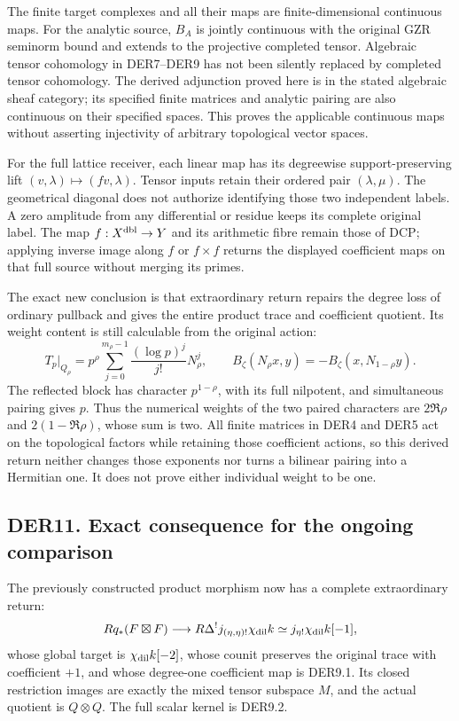 The finite target complexes and all their maps are finite-dimensional
continuous maps. For the analytic source, \(B_A\) is jointly continuous
with the original GZR seminorm bound and extends to the projective
completed tensor. Algebraic tensor cohomology in DER7--DER9 has not been
silently replaced by completed tensor cohomology. The derived adjunction
proved here is in the stated algebraic sheaf category; its specified
finite matrices and analytic pairing are also continuous on their
specified spaces. This proves the applicable continuous maps without
asserting injectivity of arbitrary topological vector spaces.

For the full lattice receiver, each linear map has its degreewise
support-preserving lift \((v,\lambda)\mapsto(fv,\lambda)\). Tensor
inputs retain their ordered pair \((\lambda,\mu)\). The geometrical
diagonal does not authorize identifying those two independent labels. A
zero amplitude from any differential or residue keeps its complete
original label. The map \(f:X^{\rm dbl}\to Y\) and its arithmetic fibre
remain those of DCP; applying inverse image along \(f\) or \(f\times f\)
returns the displayed coefficient maps on that full source without
merging its primes.

The exact new conclusion is that extraordinary return repairs the degree
loss of ordinary pullback and gives the entire product trace and
coefficient quotient. Its weight content is still calculable from the
original action: \[
T_p|_{Q_\rho}
=p^\rho\sum_{j=0}^{m_\rho-1}\frac{(\log p)^j}{j!}N_\rho^j,\qquad
B_\zeta(N_\rho x,y)=-B_\zeta(x,N_{1-\rho}y).
\] The reflected block has character \(p^{1-\rho}\), with its full
nilpotent, and simultaneous pairing gives \(p\). Thus the numerical
weights of the two paired characters are \(2\Re\rho\) and
\(2(1-\Re\rho)\), whose sum is two. All finite matrices in DER4 and DER5
act on the topological factors while retaining those coefficient
actions, so this derived return neither changes those exponents nor
turns a bilinear pairing into a Hermitian one. It does not prove either
individual weight to be one.

\subsection{DER11. Exact consequence for the ongoing
comparison}\label{der11.-exact-consequence-for-the-ongoing-comparison}

The previously constructed product morphism now has a complete
extraordinary return: \[
Rq_*(F\boxtimes F)\longrightarrow
R\Delta^!j_{(\eta,\eta)!}\chi_{\rm dil}k
 \simeq j_{\eta!}\chi_{\rm dil}k[-1],
\] whose global target is \(\chi_{\rm dil}k[-2]\), whose counit
preserves the original trace with coefficient \(+1\), and whose
degree-one coefficient map is DER9.1. Its closed restriction images are
exactly the mixed tensor subspace \(M\), and the actual quotient is
\(Q\otimes Q\). The full scalar kernel is DER9.2.

